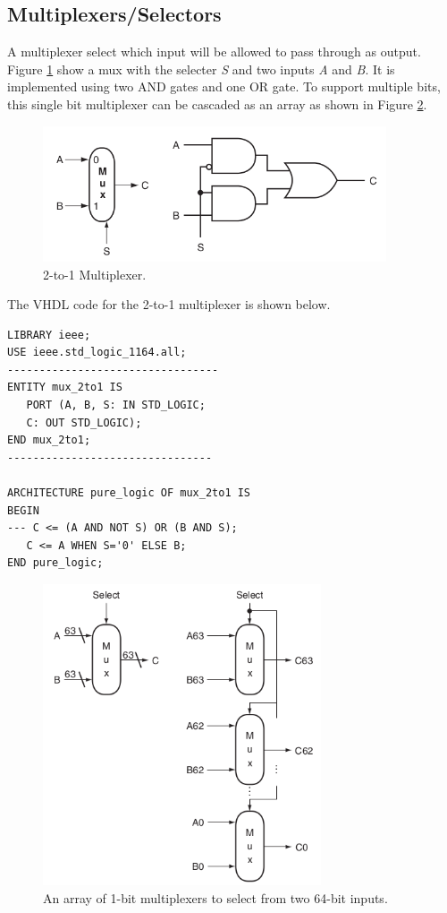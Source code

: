 \documentclass[a4paper, 11pt,oneside]{article}
\begin{document}
\subsection{Multiplexers/Selectors}
A multiplexer select which input will be allowed to pass through as output. Figure \ref{fig:mux} show a mux with the selecter \textit{S} and two inputs \textit{A} and \textit{B}. It is implemented using two AND gates and one OR gate. To support multiple bits, this single bit multiplexer can be cascaded as an array as shown in Figure \ref{fig:mux_bits}.

\begin{figure}[H]
	\begin{center}
	\includegraphics[width=4in]{mux.png}
	\caption{2-to-1 Multiplexer.}
	\label{fig:mux} 
	\end{center}
\end{figure}

The VHDL code for the 2-to-1 multiplexer is shown below.
\begin{verbatim}
LIBRARY ieee;
USE ieee.std_logic_1164.all;
---------------------------------
ENTITY mux_2to1 IS
   PORT (A, B, S: IN STD_LOGIC;
   C: OUT STD_LOGIC);
END mux_2to1;
--------------------------------

ARCHITECTURE pure_logic OF mux_2to1 IS
BEGIN
--- C <= (A AND NOT S) OR (B AND S);                       
   C <= A WHEN S='0' ELSE B;
END pure_logic;
\end{verbatim}



\begin{figure}[H]
	\begin{center}
	\includegraphics[height=3.5in]{mux_bits.png}
	\caption{An array of 1-bit multiplexers to select from two 64-bit inputs.}
	\label{fig:mux_bits} 
	\end{center}
\end{figure}
\end{document}
